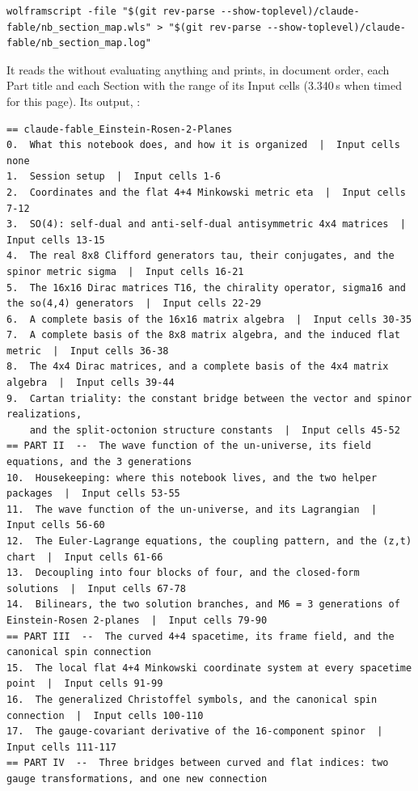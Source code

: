 \begin{Verbatim}
wolframscript -file "$(git rev-parse --show-toplevel)/claude-fable/nb_section_map.wls" > "$(git rev-parse --show-toplevel)/claude-fable/nb_section_map.log"
\end{Verbatim}

It reads the  without evaluating anything and prints, in document order, each Part title
and each Section with the range of its Input cells (3.340\,s when timed for this page). Its output,
:

\begin{Verbatim}[fontsize=\scriptsize]
== claude-fable_Einstein-Rosen-2-Planes
0.  What this notebook does, and how it is organized  |  Input cells none
1.  Session setup  |  Input cells 1-6
2.  Coordinates and the flat 4+4 Minkowski metric eta  |  Input cells 7-12
3.  SO(4): self-dual and anti-self-dual antisymmetric 4x4 matrices  |  Input cells 13-15
4.  The real 8x8 Clifford generators tau, their conjugates, and the spinor metric sigma  |  Input cells 16-21
5.  The 16x16 Dirac matrices T16, the chirality operator, sigma16 and the so(4,4) generators  |  Input cells 22-29
6.  A complete basis of the 16x16 matrix algebra  |  Input cells 30-35
7.  A complete basis of the 8x8 matrix algebra, and the induced flat metric  |  Input cells 36-38
8.  The 4x4 Dirac matrices, and a complete basis of the 4x4 matrix algebra  |  Input cells 39-44
9.  Cartan triality: the constant bridge between the vector and spinor realizations,
    and the split-octonion structure constants  |  Input cells 45-52
== PART II  --  The wave function of the un-universe, its field equations, and the 3 generations
10.  Housekeeping: where this notebook lives, and the two helper packages  |  Input cells 53-55
11.  The wave function of the un-universe, and its Lagrangian  |  Input cells 56-60
12.  The Euler-Lagrange equations, the coupling pattern, and the (z,t) chart  |  Input cells 61-66
13.  Decoupling into four blocks of four, and the closed-form solutions  |  Input cells 67-78
14.  Bilinears, the two solution branches, and M6 = 3 generations of Einstein-Rosen 2-planes  |  Input cells 79-90
== PART III  --  The curved 4+4 spacetime, its frame field, and the canonical spin connection
15.  The local flat 4+4 Minkowski coordinate system at every spacetime point  |  Input cells 91-99
16.  The generalized Christoffel symbols, and the canonical spin connection  |  Input cells 100-110
17.  The gauge-covariant derivative of the 16-component spinor  |  Input cells 111-117
== PART IV  --  Three bridges between curved and flat indices: two gauge transformations, and one new connection

\end{Verbatim}
